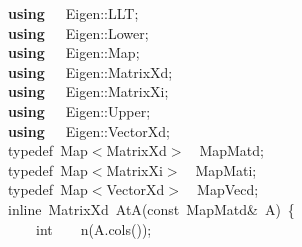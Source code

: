\documentclass[shortnames,article]{jss}
\newcommand{\hlstd}[1]{\textcolor[rgb]{0,0,0}{#1}}
\newcommand{\hlopt}[1]{\textcolor[rgb]{0,0,0}{#1}}
\newcommand{\hlkwa}[1]{\textcolor[rgb]{0.61,0.13,0.93}{\bf{#1}}}
\newcommand{\hlkwb}[1]{\textcolor[rgb]{0.13,0.54,0.13}{#1}}
\newcommand{\hlkwc}[1]{\textcolor[rgb]{0,0,1}{#1}}
\newcommand{\hlkwd}[1]{\textcolor[rgb]{0,0,0}{#1}}
\begin{document}
\begin{figure}[htb]
  \noindent
  \ttfamily
  \hlstd{}\hlkwa{using}\hlstd{\ \ \ }\hlkwa{}\hlstd{Eigen}\hlopt{::}\hlstd{LLT}\hlopt{;}\hspace*{\fill}\\
  \hlstd{}\hlkwa{using}\hlstd{\ \ \ }\hlkwa{}\hlstd{Eigen}\hlopt{::}\hlstd{Lower}\hlopt{;}\hspace*{\fill}\\
  \hlstd{}\hlkwa{using}\hlstd{\ \ \ }\hlkwa{}\hlstd{Eigen}\hlopt{::}\hlstd{Map}\hlopt{;}\hspace*{\fill}\\
  \hlstd{}\hlkwa{using}\hlstd{\ \ \ }\hlkwa{}\hlstd{Eigen}\hlopt{::}\hlstd{MatrixXd}\hlopt{;}\hspace*{\fill}\\
  \hlstd{}\hlkwa{using}\hlstd{\ \ \ }\hlkwa{}\hlstd{Eigen}\hlopt{::}\hlstd{MatrixXi}\hlopt{;}\hspace*{\fill}\\
  \hlstd{}\hlkwa{using}\hlstd{\ \ \ }\hlkwa{}\hlstd{Eigen}\hlopt{::}\hlstd{Upper}\hlopt{;}\hspace*{\fill}\\
  \hlstd{}\hlkwa{using}\hlstd{\ \ \ }\hlkwa{}\hlstd{Eigen}\hlopt{::}\hlstd{VectorXd}\hlopt{;}\hspace*{\fill}\\
  \hlstd{}\hlkwc{typedef\ }\hlstd{Map}\hlopt{$<$}\hlstd{MatrixXd}\hlopt{$>$}\hlstd{\ \ }\hlopt{}\hlstd{MapMatd}\hlopt{;}\hspace*{\fill}\\
  \hlstd{}\hlkwc{typedef\ }\hlstd{Map}\hlopt{$<$}\hlstd{MatrixXi}\hlopt{$>$}\hlstd{\ \ }\hlopt{}\hlstd{MapMati}\hlopt{;}\hspace*{\fill}\\
  \hlstd{}\hlkwc{typedef\ }\hlstd{Map}\hlopt{$<$}\hlstd{VectorXd}\hlopt{$>$}\hlstd{\ \ }\hlopt{}\hlstd{MapVecd}\hlopt{;}\hspace*{\fill}\\
  \hlstd{}\hlkwc{inline\ }\hlstd{MatrixXd\ }\hlkwd{AtA}\hlstd{}\hlopt{(}\hlstd{}\hlkwb{const\ }\hlstd{MapMatd}\hlopt{\&\ }\hlstd{A}\hlopt{)\ \{}\hspace*{\fill}\\
  \hlstd{}\hlstd{\ \ \ \ }\hlstd{}\hlkwb{int}\hlstd{\ \ \ \ }\hlkwb{}\hlstd{}\hlkwd{n}\hlstd{}\hlopt{(}\hlstd{A}\hlopt{.}\hlstd{}\hlkwd{cols}\hlstd{}\hlopt{());}\hspace*{\fill}\\

\end{figure}
\end{document}
